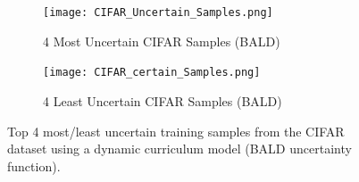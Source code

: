 \begin{figure}[h!]
\hspace*{-3cm}    
\centering
\begin{subfigure}{0.7\textwidth}
  \centering
  \texttt{[image: CIFAR\_Uncertain\_Samples.png]}
  \caption{4 Most Uncertain CIFAR Samples (BALD)}
  \label{fig:CIFAR_Uncertain}
\end{subfigure}%
\begin{subfigure}{0.7\textwidth}
\hspace*{-1cm}   
  \centering
  \texttt{[image: CIFAR\_certain\_Samples.png]}
  \caption{4 Least Uncertain CIFAR Samples (BALD)}
  \label{fig:CIFAR Certain}
\end{subfigure}
\caption{Top 4 most/least uncertain training samples from the CIFAR dataset using a dynamic curriculum model (BALD uncertainty function).}
\label{fig:CIFARSampleUncertainty}
\end{figure}

